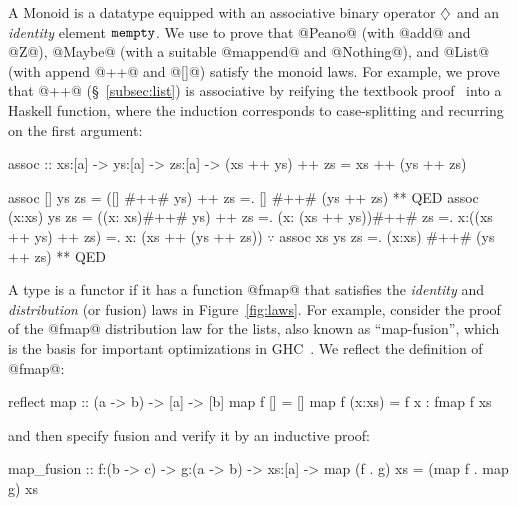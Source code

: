 
%
A Monoid is a datatype equipped with an associative
binary operator $\diamondsuit$ and an \emph{identity}
element $\texttt{mempty}$.
%
We use \toolname to prove that
%
@Peano@ (with @add@ and @Z@),
@Maybe@ (with a suitable @mappend@ and @Nothing@), and
@List@ (with append @++@ and @[]@) satisfy the monoid laws.
%
For example, we prove that @++@ (\S~\ref{subsec:list})
is associative by reifying the textbook proof~\cite{HuttonBook}
into a Haskell function, where the induction
corresponds to case-splitting and recurring
on the first argument:
%
\begin{mcode}
assoc :: xs:[a] -> ys:[a] -> zs:[a] ->
       {(xs ++ ys) ++ zs = xs ++ (ys ++ zs)}

assoc [] ys zs     = ([] #++# ys) ++ zs
                   =. [] #++# (ys ++ zs)
                   ** QED
assoc (x:xs) ys zs = ((x:  xs)#++# ys) ++ zs
                   =. (x: (xs ++ ys))#++# zs
                   =.  x:((xs ++ ys) ++ zs)
                   =.  x: (xs ++ (ys ++ zs))
                       $\because$ assoc xs ys zs
                   =. (x:xs)  #++# (ys ++ zs)
                   ** QED
\end{mcode}


%
A type is a functor if it has a function
@fmap@ that satisfies the \emph{identity}
and \emph{distribution} (or fusion) laws
in Figure~\ref{fig:laws}.
%
For example, consider the proof of
the @fmap@ distribution law for the lists,
also known as ``map-fusion'', which is the
basis for important optimizations in
GHC~\cite{ghc-map-fusion}.
%
We reflect the definition of @fmap@:
%
\begin{code}
  reflect map :: (a -> b) -> [a] -> [b]
  map f []     = []
  map f (x:xs) = f x : fmap f xs
\end{code}
%
and then specify fusion and verify it by an inductive proof:
%
\begin{mcode}
  map_fusion
    :: f:(b -> c) -> g:(a -> b) -> xs:[a]
    -> {map (f . g) xs = (map f . map g) xs}
\end{mcode}

